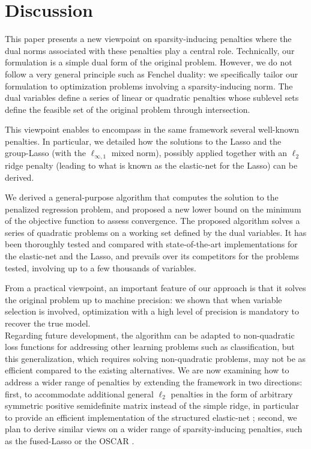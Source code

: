 \section{Discussion}


This paper presents a new viewpoint on sparsity-inducing penalties
where the dual norms associated with these penalties play a central role. 
Technically, our formulation is a simple dual form of the original problem. 
However, we do not follow a very general principle such as Fenchel duality: 
we specifically tailor our formulation to optimization problems involving a 
sparsity-inducing norm.
The dual variables define a series of linear or quadratic penalties whose 
sublevel sets define the feasible set of the original problem through
intersection.

This  viewpoint  enables  to  encompass in the same framework  several
well-known penalties. In particular, we detailed how the solutions to the Lasso and the
group-Lasso (with the $\ell_{\infty,1}$  mixed norm), possibly applied
together with an  $\ell_2$ ridge penalty (leading to what  is known as
the elastic-net for the Lasso) can be derived. 

We derived a  general-purpose algorithm that computes the solution to
the penalized regression problem,  and proposed a new lower
bound  on the  minimum  of  the objective  function to
assess convergence.  The proposed  algorithm solves a series of
quadratic  problems on a working set defined  by the dual  variables.   
It has  been
thoroughly tested  and compared with  state-of-the-art implementations
for the elastic-net and the Lasso, and prevails over its competitors for 
the problems tested, involving  up to a few thousands of variables.

From a  practical viewpoint, an  important feature of our  approach is
that it solves the original problem  up to machine precision: we shown
that when  variable selection  is involved,  optimization with  a high
level of precision is mandatory to recover the true model.
\\

Regarding  future  development,  the   algorithm  can  be  adapted  to
non-quadratic loss  functions for  addressing other  learning problems
such  as  classification,  but  this  generalization,  which  requires
solving non-quadratic  problems, may not  be as efficient  compared to
the  existing alternatives.   We are  now examining  how to  address a
wider range of penalties by extending the framework in two directions:
first,  to accommodate  additional general  $\ell_2$ penalties  in the
form of  arbitrary symmetric  positive semidefinite matrix  instead of
the simple ridge, in particular to provide an efficient implementation
of the  structured elastic-net \citep{2010_AOS_Slawski} ;  second, we
plan to  derive similar  views on a  wider range  of sparsity-inducing
penalties, such as the fused-Lasso or the OSCAR \citep{Bondell08}.
